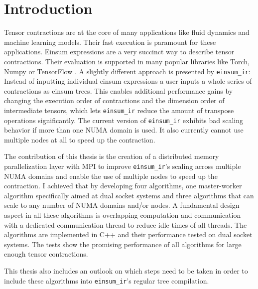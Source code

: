 \section{Introduction}

Tensor contractions are at the core of many applications like fluid dynamics and machine learning models.
Their fast execution is paramount for these applications.
Einsum expressions are a very succinct way to describe tensor contractions.
Their evaluation is supported in many popular libraries like Torch\cite{torch}, Numpy\cite{numpy} or TensorFlow \cite{tensorflow}.
A slightly different approach is presented by \texttt{einsum\_ir}\cite{einsum_ir}:
Instead of inputting individual einsum expressions a user inputs a whole series of contractions as einsum trees.
This enables additional performance gains by changing the execution order of contractions and the dimension order of intermediate tensors, which lets \texttt{einsum\_ir} reduce the amount of transpose operations significantly.
The current version of \texttt{einsum\_ir} exhibits bad scaling behavior if more than one NUMA domain is used.
It also currently cannot use multiple nodes at all to speed up the contraction.

The contribution of this thesis is the creation of a distributed memory parallelization layer with MPI to improve \texttt{einsum\_ir}'s scaling across multiple NUMA domains and enable the use of multiple nodes to speed up the contraction.
I achieved that by developing four algorithms, one master-worker algorithm specifically aimed at dual socket systems and three algorithms that can scale to any number of NUMA domains and/or nodes.
A fundamental design aspect in all these algorithms is overlapping computation and communication with a dedicated communication thread to reduce idle times of all threads.
The algorithms are implemented in C++ and their performance tested on dual socket systems.
The tests show the promising performance of all algorithms for large enough tensor contractions.

This thesis also includes an outlook on which steps need to be taken in order to include these algorithms into \texttt{einsum\_ir}'s regular tree compilation.


